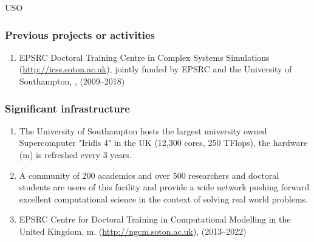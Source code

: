 \begin{sitedescription}{USO}
\subsubsection*{Previous projects or activities}

\begin{enumerate}
\item EPSRC Doctoral Training Centre in Complex Systems Simulations
  (\href{http://icss.soton.ac.uk}{http://icss.soton.ac.uk}), jointly
funded by EPSRC and the University of Southampton, , (2009--2018)
\end{enumerate}

\subsubsection*{Significant infrastructure}
\begin{enumerate}
\item The University of Southampton hosts the largest university owned
  Supercomputer "Iridis 4" in the UK (12,300 cores, 250 TFlops),
  the hardware (m) is refreshed every 3 years.
\item A community of 200 academics and over 500 researchers and
  doctoral students are users of this facility and provide a wide
  network pushing forward excellent computational science in the
  context of solving real world problems.
\item EPSRC Centre for Doctoral Training in Computational Modelling in
  the United Kingdom,
  m. (\href{http://ngcm.soton.ac.uk}{http://ngcm.soton.ac.uk}),
  (2013--2022)
\end{enumerate}
\end{sitedescription}
